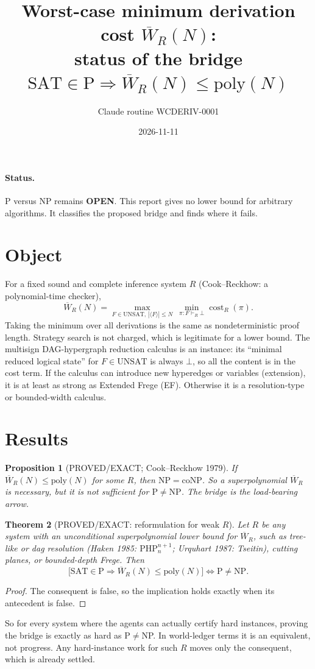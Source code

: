 \documentclass[11pt]{article}
\title{Worst-case minimum derivation cost $\overline W_R(N)$:\\ status of the bridge $\mathrm{SAT}\in\mathrm P\Rightarrow \overline W_R(N)\le\mathrm{poly}(N)$}
\author{Claude routine WCDERIV-0001}\date{2026-11-11}
\newtheorem{theorem}{Theorem}\newtheorem{proposition}[theorem]{Proposition}
\theoremstyle{remark}\newtheorem{remark}[theorem]{Remark}
\begin{document}
\maketitle
\paragraph{Status.} P versus NP remains \textbf{OPEN}. This report gives no lower bound for arbitrary
algorithms. It classifies the proposed bridge and finds where it fails.

\section{Object}
For a fixed sound and complete inference system $R$ (Cook--Reckhow: a polynomial-time checker),
\[
\overline W_R(N)=\max_{F\in\mathrm{UNSAT},\,|\langle F\rangle|\le N}\ \min_{\pi:F\vdash_R\bot}\operatorname{cost}_R(\pi).
\]
Taking the minimum over all derivations is the same as nondeterministic proof length. Strategy search is not
charged, which is legitimate for a lower bound. The multisign DAG-hypergraph reduction calculus is an instance:
its ``minimal reduced logical state'' for $F\in\mathrm{UNSAT}$ is always $\bot$, so all the content is in
the cost term. If the calculus can introduce new hyperedges or variables (extension), it is at least as strong
as Extended Frege (EF). Otherwise it is a resolution-type or bounded-width calculus.

\section{Results}
\begin{proposition}[PROVED/EXACT; Cook--Reckhow 1979]\label{p:cr}
If $\overline W_R(N)\le\mathrm{poly}(N)$ for some $R$, then $\mathrm{NP}=\mathrm{coNP}$. So a superpolynomial
$\overline W_R$ is necessary, but it is not sufficient for $\mathrm P\ne\mathrm{NP}$. The bridge is the
load-bearing arrow.
\end{proposition}

\begin{theorem}[PROVED/EXACT: reformulation for weak $R$]\label{t:reform}
Let $R$ be any system with an unconditional superpolynomial lower bound for $\overline W_R$, such as
tree-like or dag resolution (Haken 1985: $\mathrm{PHP}^{n+1}_n$; Urquhart 1987: Tseitin), cutting planes,
or bounded-depth Frege. Then
\[
\bigl[\mathrm{SAT}\in\mathrm P\Rightarrow\overline W_R(N)\le\mathrm{poly}(N)\bigr]\iff \mathrm P\ne\mathrm{NP}.
\]
\end{theorem}
\begin{proof}The consequent is false, so the implication holds exactly when its antecedent is false.\end{proof}
So for every system where the agents can actually certify hard instances, proving the bridge is exactly as hard
as P$\ne$NP. In world-ledger terms it is an equivalent, not progress. Any hard-instance work for such $R$
moves only the consequent, which is already settled.
\end{document}
